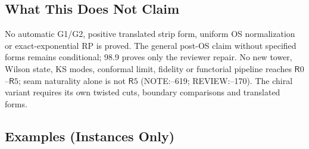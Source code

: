 \subsection{What This Does Not Claim}

No automatic G1/G2, positive translated strip form, uniform OS normalization or exact-exponential RP is proved.
The general post-OS claim without specified forms remains conditional; 98.9 proves only the reviewer repair.
No new tower, Wilson state, KS modes, conformal limit, fidelity or functorial pipeline reaches
\(\mathsf R0\)--\(\mathsf R5\); seam naturality alone is not \(\mathsf R5\) (NOTE:--619; REVIEW:--170).
The chiral variant requires its own twisted cuts, boundary comparisons and translated forms.

\subsection{Examples (Instances Only)}

